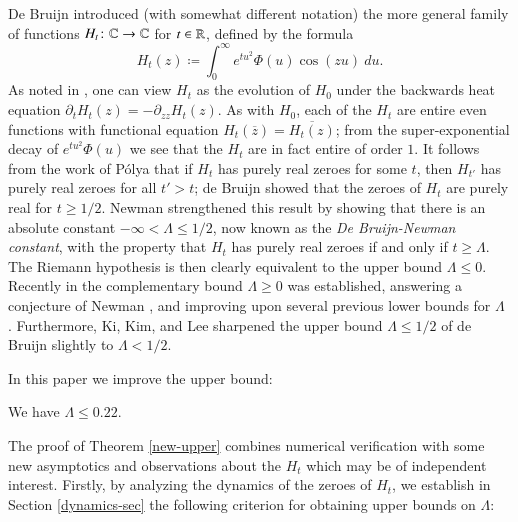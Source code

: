 De Bruijn \cite{debr} introduced (with somewhat different notation) the more general family of functions $H_t \colon \mathbb{C} \to \mathbb{C}$ for $t \in \mathbb{R}$, defined by the formula
\begin{equation}\label{htdef}
 H_t(z) \coloneqq \int_0^\infty e^{tu^2} \Phi(u) \cos(zu)\ du.
\end{equation}
As noted in \cite[p.114]{csv}, one can view $H_t$ as the evolution of $H_0$ under the backwards heat equation $\partial_t H_t(z)= -\partial_{zz} H_t(z)$.
As with $H_0$, each of the $H_t$ are entire even functions with functional equation $H_t(\overline{z}) = \overline{H_t(z)}$; from the super-exponential decay of $e^{tu^2} \Phi(u)$ we see that the $H_t$ are in fact entire of order $1$.  It follows from the work of P\'olya \cite{polya} that if $H_t$ has purely real zeroes for some $t$, then $H_{t'}$ has purely real zeroes for all $t'>t$; de Bruijn showed that the zeroes of $H_t$ are purely real for $t \geq 1/2$.  Newman \cite{newman} strengthened this result by showing that there is an absolute constant $-\infty < \Lambda \leq 1/2$, now known as the \emph{De Bruijn-Newman constant}, with the property that $H_t$ has purely real zeroes if and only if $t \geq \Lambda$.  The Riemann hypothesis is then clearly equivalent to the upper bound $\Lambda \leq 0$.  Recently in \cite{brad} the complementary bound $\Lambda \geq 0$ was established, answering a conjecture of Newman \cite{newman}, and improving upon several previous lower bounds for $\Lambda$ \cite{cnv,nrv,crv,cosv,odlyzko,saouter}.  Furthermore, Ki, Kim, and Lee \cite{kkl} sharpened the upper bound $\Lambda \leq 1/2$ of de Bruijn \cite{debr} slightly to $\Lambda < 1/2$.  

In this paper we improve the upper bound:

\begin{theorem}\label{new-upper}  We have $\Lambda \leq 0.22$.
\end{theorem}

The proof of Theorem \ref{new-upper} combines numerical verification with some new asymptotics and observations about the $H_t$ which may be of independent interest.  Firstly, by analyzing the dynamics of the zeroes of $H_t$, we establish in Section \ref{dynamics-sec} the following criterion for obtaining upper bounds on $\Lambda$:

